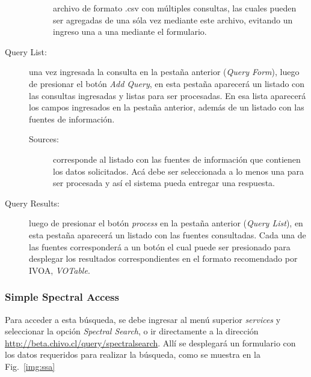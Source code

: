 \begin{description}
\begin{description}
	archivo de formato .csv\footnotemark{} con múltiples
	consultas, las cuales pueden ser agregadas de una sóla vez
	mediante este archivo, evitando un ingreso una a una mediante
	el formulario.
    \end{description}  
  \item [Query List:] una vez ingresada la consulta en la pestaña
    anterior (\emph{Query Form}), luego de presionar el botón
    \emph{Add Query}, en esta pestaña aparecerá un listado con las
    consultas ingresadas y listas para ser procesadas. En esa lista
    aparecerá los campos ingresados en la pestaña anterior, además de
    un listado con las fuentes de información.
    \begin{description}
      \item [Sources:] corresponde al listado con las fuentes de
	información que contienen los datos solicitados. Acá debe ser
	seleccionada a lo menos una para ser procesada y así el
	sistema pueda entregar una respuesta.
    \end{description}  
  \item [Query Results:] luego de presionar el botón \emph{process} en
    la pestaña anterior (\emph{Query List}), en esta pestaña
    aparecerá un listado con las fuentes consultadas. Cada una de las
    fuentes corresponderá a un botón el cual puede ser presionado para
    desplegar los resultados correspondientes en el formato
    recomendado por IVOA, \emph{VOTable}.
\end{description}


\subsubsection{Simple Spectral Access}

Para acceder a esta búsqueda, se debe ingresar al menú superior
\emph{services} y seleccionar la opción \emph{Spectral Search}, o ir
directamente a la dirección
\url{http://beta.chivo.cl/query/spectralsearch}. Allí se desplegará un
formulario con los datos requeridos para realizar la búsqueda, como se
muestra en la Fig.~\ref{img:ssa}

